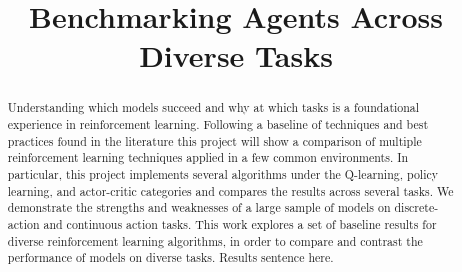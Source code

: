 \documentclass[conference]{IEEEtran}
\begin{document}
\title{Benchmarking Agents Across Diverse Tasks}

\author{

\and


\and


\and


\and

}

\maketitle

\begin{abstract}
    Understanding which models succeed and why at which tasks is a foundational experience in reinforcement learning.
    Following a baseline of techniques and best practices found in the literature this project will show a comparison of multiple reinforcement learning techniques applied in a few common environments.
    In particular, this project implements several algorithms under the Q-learning, policy learning, and actor-critic categories and compares the results across several tasks.
    We demonstrate the strengths and weaknesses of a large sample of models on discrete-action and continuous action tasks.
    This work explores a set of baseline results for diverse reinforcement learning algorithms, in order to compare and contrast the performance of models on diverse tasks.
    Results sentence here.
\end{abstract}
\end{document}
